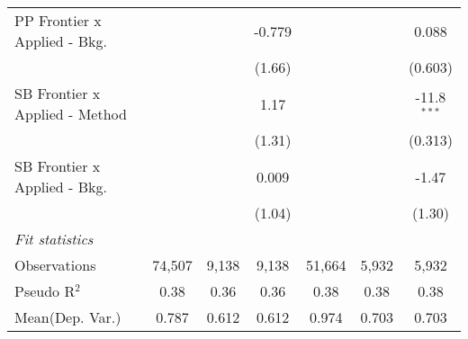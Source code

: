 \begin{tabular}{lcccccc}
   PP Frontier x Applied - Bkg.   &               &               & -0.779       &               &               & 0.088\\   
                                  &               &               & (1.66)       &               &               & (0.603)\\   
   SB Frontier x Applied - Method &               &               & 1.17         &               &               & -11.8$^{***}$\\   
                                  &               &               & (1.31)       &               &               & (0.313)\\   
   SB Frontier x Applied - Bkg.   &               &               & 0.009        &               &               & -1.47\\   
                                  &               &               & (1.04)       &               &               & (1.30)\\   
   \midrule
   \emph{Fit statistics}\\
   Observations                   & 74,507        & 9,138         & 9,138        & 51,664        & 5,932         & 5,932\\  
   Pseudo R$^2$                   & 0.38          & 0.36          & 0.36         & 0.38          & 0.38          & 0.38\\  
Mean(Dep. Var.) & 0.787 & 0.612 & 0.612 & 0.974 & 0.703 & 0.703 \\
   

\end{tabular}
